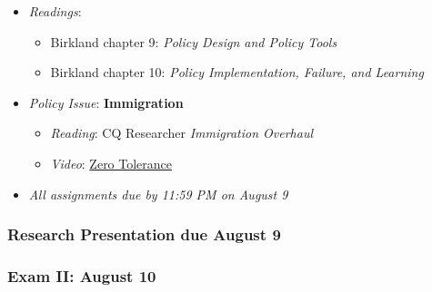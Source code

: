 \begin{itemize}

\item
  \emph{Readings}:

  \begin{itemize}
  
  \item
    Birkland chapter 9: \emph{Policy Design and Policy Tools}\\
  \item
    Birkland chapter 10: \emph{Policy Implementation, Failure, and
    Learning}
  \end{itemize}
\item
  \emph{Policy Issue}: \textbf{Immigration}

  \begin{itemize}
  
  \item
    \emph{Reading}: CQ Researcher \emph{Immigration Overhaul}
  \item
    \emph{Video}:
    \href{https://www.pbs.org/video/zero-tolerance-en2plm/}{Zero
    Tolerance}
  \end{itemize}
\item
  \emph{All assignments due by 11:59 PM on August 9}
\end{itemize}

\hypertarget{research-presentation-due-august-9}{%
\subsubsection{Research Presentation due August
9}\label{research-presentation-due-august-9}}

\hypertarget{exam-ii-august-10}{%
\subsubsection{Exam II: August 10}\label{exam-ii-august-10}}
